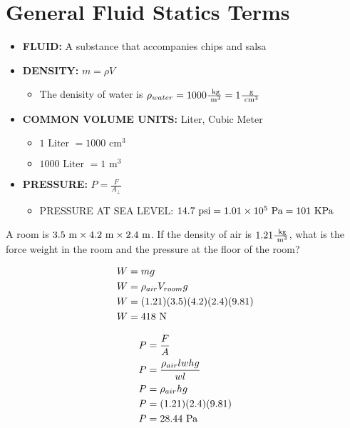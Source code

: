 \section{General Fluid Statics Terms}

\begin{itemize}
    \item \textbf{FLUID:} A substance that accompanies chips and salsa
    \item \textbf{DENSITY:} $m = \rho V$
    \begin{itemize}
        \item The denisity of water is $\rho_{water} = 1000 \frac{\text{ kg}}{\text{ m}^3} = 1 \frac{\text{ g}}{\text{ cm}^3}$
    \end{itemize}
    \item \textbf{COMMON VOLUME UNITS:} Liter, Cubic Meter
    \begin{itemize}
        \item $1 \text{ Liter } = 1000 \text{ cm}^3$
        \item $1000 \text{ Liter } = 1 \text{ m}^3$
    \end{itemize}
    \item \textbf{PRESSURE:} $P = \frac{F}{A_\perp}$
    \begin{itemize}
        \item PRESSURE AT SEA LEVEL: $14.7 \text{ psi} = 1.01 \times 10^5 \text{ Pa} = 101 \text{ KPa}$
    \end{itemize}
\end{itemize}

\begin{problem}
    A room is $3.5\text{ m} \times 4.2\text{ m} \times 2.4\text{ m}$. If the density of air is $1.21 \frac{\text{ kg}}{\text{ m}^3}$, what is the force weight in the room and the pressure at the floor of the room?

    \[
    \begin{aligned}
        W &= mg\\
        W &= \rho_{air}V_{room}g\\
        W &= (1.21)(3.5)(4.2)(2.4)(9.81)\\
        W &= 418 \text{ N} 
    \end{aligned}    
    \]

    \[
    \begin{aligned}
        P &= \frac{F}{A}\\
        P &= \frac{\rho_{air}lwhg}{wl}\\
        P &= \rho_{air}hg\\
        P &= (1.21)(2.4)(9.81)\\
        P &= 28.44 \text{ Pa}
    \end{aligned}    
    \]
\end{problem}\newpage

